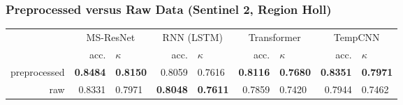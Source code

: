 \begin{frame}
\frametitle{Preprocessed versus Raw Data (Sentinel 2, Region Holl)}

\begin{tabular}{rrlrlrlrl}
\toprule
& \multicolumn{2}{c}{MS-ResNet} & \multicolumn{2}{c}{RNN (LSTM)} & \multicolumn{2}{c}{Transformer} & \multicolumn{2}{c}{TempCNN} \\
& acc. & $\kappa$ & acc. & $\kappa$ & acc. & $\kappa$ & acc. & $\kappa$ \\
\cmidrule(lr){2-3}\cmidrule(lr){4-5} \cmidrule(lr){6-7}\cmidrule(lr){8-9}
preprocessed & \textbf{0.8484} & \textbf{0.8150} & 0.8059 & 0.7616 & \textbf{0.8116} & \textbf{0.7680} & \textbf{0.8351} & \textbf{0.7971} \\
raw 		 & 0.8331 & 0.7971 & \textbf{0.8048} & \textbf{0.7611} & 0.7859 & 0.7420 & 0.7944 & 0.7462 \\
\bottomrule
\end{tabular}

\end{frame}


